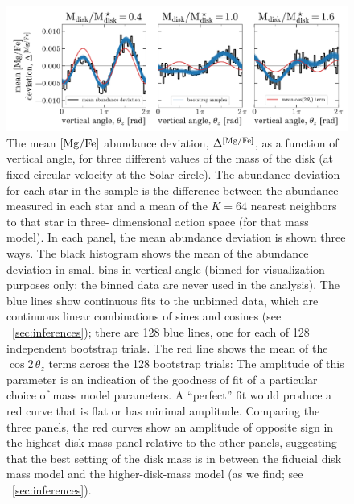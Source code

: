 \documentclass[modern]{aastex63}
\begin{document}
\begin{figure}[!tp] %
  \begin{mdframed}
    \color{captiongray}
  \begin{center}
  \includegraphics[width=\textwidth]{sinusoid-fits.pdf}
  \end{center}
  \caption{%
    The mean ${[\mathrm{Mg}/\mathrm{Fe}]}$ abundance deviation, $\Delta^{{[\mathrm{Mg}/\mathrm{Fe}]}}$, as a
    function of vertical angle, for three different values of the mass of the
    disk (at fixed circular velocity at the Solar circle).
    The abundance deviation for each star in the sample is the difference
    between the abundance measured in each star and a mean of the $K=64$ nearest
    neighbors to that star in three- dimensional action space (for that mass
    model).
    In each panel, the mean abundance deviation is shown three ways.
    The black histogram shows the mean of the abundance deviation in small bins
    in vertical angle (binned for visualization purposes only: the binned data
    are never used in the analysis).
    The blue lines show continuous fits to the unbinned data, which are
    continuous linear combinations of sines and cosines (see
    \sectionname~\ref{sec:inferences}); there are 128 blue lines, one for each
    of 128 independent bootstrap trials.
    The red line shows the mean of the $\cos 2\,\theta_z$ terms across the 128
    bootstrap trials: The amplitude of this parameter is an indication of the
    goodness of fit of a particular choice of mass model parameters.
    A ``perfect'' fit would produce a red curve that is flat or has minimal
    amplitude.
    Comparing the three panels, the red curves show an amplitude of opposite
    sign in the highest-disk-mass panel relative to the other panels, suggesting
    that the best setting of the disk mass is in between the fiducial disk mass
    model and the higher-disk-mass model (as we find; see
    \sectionname~\ref{sec:inferences}).
  \label{fig:sinusoid-fits}
  }
  \end{mdframed}
\end{figure}
\end{document}
